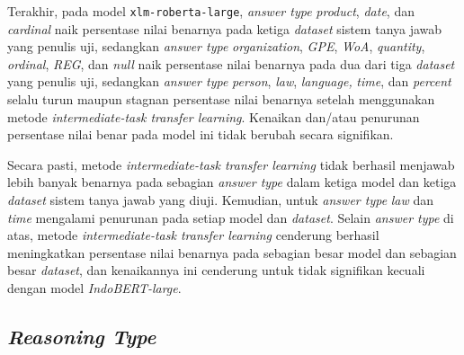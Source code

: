 Terakhir, pada model \texttt{xlm-roberta-large}, \emph{answer type} \emph{product}, \emph{date}, dan \emph{cardinal} naik persentase nilai benarnya pada ketiga \emph{dataset} sistem tanya jawab yang penulis uji, sedangkan \emph{answer type} \emph{organization}, \emph{GPE}, \emph{WoA}, \emph{quantity}, \emph{ordinal}, \emph{REG}, dan \emph{null} naik persentase nilai benarnya pada dua dari tiga \emph{dataset} yang penulis uji, sedangkan \emph{answer type} \emph{person}, \emph{law}, \emph{language,} \emph{time}, dan \emph{percent} selalu turun maupun stagnan persentase nilai benarnya setelah menggunakan metode \emph{intermediate-task transfer learning}. Kenaikan dan/atau penurunan persentase nilai benar pada model ini tidak berubah secara signifikan.

Secara pasti, metode \emph{intermediate-task transfer learning} tidak berhasil menjawab lebih banyak benarnya pada sebagian \emph{answer type} dalam ketiga model dan ketiga \emph{dataset} sistem tanya jawab yang diuji. Kemudian, untuk \emph{answer type} \emph{law} dan \emph{time} mengalami penurunan pada setiap model dan \emph{dataset}. Selain \emph{answer type} di atas, metode \emph{intermediate-task transfer learning} cenderung berhasil meningkatkan persentase nilai benarnya pada sebagian besar model dan sebagian besar \emph{dataset}, dan kenaikannya ini cenderung untuk tidak signifikan kecuali dengan model \emph{IndoBERT-large}. 

\subsection{\emph{Reasoning Type}}

